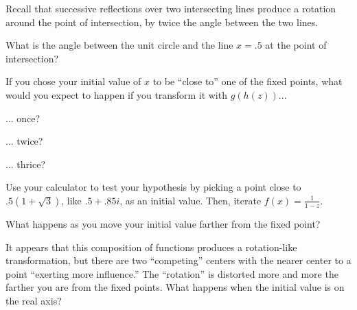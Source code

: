 \documentclass[../key.tex]{subfiles}
\begin{document}
\begin{outer_problem}
\item Recall that successive reflections over two intersecting lines produce a rotation around the point of intersection, by twice the angle between the two lines.
\end{outer_problem}

\begin{inner_problem}[start=1]
\item What is the angle between the unit circle and the line $x=.5$ at the point of intersection?
\end{inner_problem}

\begin{inner_problem}
\item If you chose your initial value of $x$ to be ``close to'' one of the fixed points, what would you expect to happen if you transform it with $g(h(z))$...
\end{inner_problem}

\begin{iinner_problem}[start=1]
\item ... once?
\end{iinner_problem}

\begin{iinner_problem}
\item ... twice?
\end{iinner_problem}

\begin{iinner_problem}
\item ... thrice?
\end{iinner_problem}

\begin{outer_problem}
\item
\end{outer_problem}

\begin{inner_problem}[start=1]
\item Use your calculator to test your hypothesis by picking a point close to $.5(1+\sqrt{3})$, like $.5+.85i$, as an initial value. Then, iterate $f(x)=\frac{1}{1-z}$.
\end{inner_problem}

\begin{inner_problem}
\item What happens as you move your initial value farther from the fixed point?
\end{inner_problem}

\begin{outer_problem}
\item It appears that this composition of functions produces a rotation-like transformation, but there are two ``competing'' centers with the nearer center to a point ``exerting more influence.'' The ``rotation'' is distorted more and more the farther you are from the fixed points. What happens when the initial value is on the real axis?
\end{outer_problem}
\end{document}
